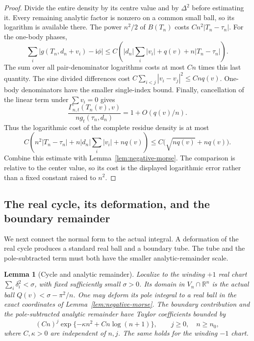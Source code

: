 \documentclass[11pt]{article}
\numberwithin{equation}{section}
\newtheorem{lemma}[theorem]{Lemma}
\theoremstyle{definition}
\newcommand{\R}{\mathbb R}
\newcommand{\ii}{\mathrm i}
\begin{document}
\begin{proof}
Divide the entire density by its centre value and by $\Delta^2$ before
estimating it.  Every remaining analytic factor is nonzero on a common
small ball, so its logarithm is available there.  The power $n^2/2$
of $B(T_n)$ costs $Cn^2|T_n-\tau_n|$.  For the one-body phases,
\[
 \sum_i|g(T_n,d_n+v_i)-\ii\phi|
 \le C\left(|d_n|\sum_i|v_i|+q(v)+n|T_n-\tau_n|\right).
\]
The sum over all pair-denominator logarithms costs at most $Cn$ times
this last quantity.  The sine divided differences cost
$C\sum_{i<j}|v_i-v_j|^2\le Cnq(v)$.  One-body denominators have the
smaller single-index bound.  Finally, cancellation of the linear term
under $\sum v_i=0$ gives
\[
 \frac{\Gamma_{n,t}(T_n(v),v)}{n g_t(\tau_n,d_n)}
 =1+O(q(v)/n).
\]
Thus the logarithmic cost of the complete residue density is at most
\[
 C\left(n^2|T_n-\tau_n|+n|d_n|\sum_i|v_i|+nq(v)\right)
 \le C\bigl(\sqrt{nq(v)}+nq(v)\bigr).
\]
Combine this estimate with Lemma~\ref{lem:negative-morse}.  The comparison is relative to the center value, so its cost is the
displayed logarithmic error rather than a fixed constant raised to $n^2$.
\end{proof}

\subsection{The real cycle, its deformation, and the boundary remainder}

We next connect the normal form to the actual integral. A deformation
of the real cycle produces a standard real ball and a boundary tube.
The tube and the pole-subtracted term must both have the smaller
analytic-remainder scale.

\begin{lemma}[Cycle and analytic remainder]
\label{lem:morse-cycle-remainder}
Localize to the winding $+1$ real chart
$\sum_i\delta_i^2<\sigma$, with fixed sufficiently small $\sigma>0$.
Its domain in $V_n\cap\R^n$ is the actual ball
$Q(v)<\sigma-\pi^2/n$.  One may deform its pole integral to a real
ball in the exact coordinates of Lemma~\ref{lem:negative-morse}.
The boundary contribution and the pole-subtracted analytic remainder
have Taylor coefficients bounded by
\begin{equation}
 (C n)^j\exp\{-\kappa n^2+C n\log(n+1)\},
 \qquad j\ge0,\quad n\ge n_0,
 \label{eq:morse-boundary-remainder}
\end{equation}
where $C,\kappa>0$ are independent of $n,j$.  The same holds for
the winding $-1$ chart.
\end{lemma}
\end{document}
